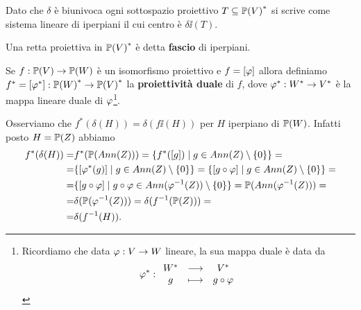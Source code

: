 \begin{multicols*}{2}
    \begin{remark}
    Dato che $\delta$ \`e biunivoca ogni sottospazio proiettivo $T\subseteq {\mathbb{P}(V)}^*$ si scrive come sistema lineare di iperpiani il cui centro \`e $\delta\ii(T)$.
    \end{remark}
    \begin{definition}
    Una retta proiettiva in ${\mathbb{P}(V)}^*$ \`e detta \textbf{fascio} di iperpiani.
    \end{definition}

    \begin{definition}
    Se $f:{\mathbb{P}(V)}\to{\mathbb{P}(W)}$ \`e un isomorfismo proiettivo e $f=[\varphi]$ allora definiamo $f^*=[\varphi^*]:{\mathbb{P}(W)}^*\to{\mathbb{P}(V)}^*$ la \textbf{proiettivit\`a duale} di $f$, dove $\varphi^*:W^*\to V^*$ \`e la mappa lineare duale di $\varphi$\footnote{Ricordiamo che data $\varphi:V\to W$ lineare, la sua mappa duale \`e data da
    \[\varphi^\ast:\begin{array}{ccc} {W^\ast} & \longrightarrow & {V^\ast}\\ {g} & \longmapsto & {g\circ \varphi} \end{array}\]}.
    \end{definition}

    \begin{remark}
    Osserviamo che $f^*(\delta(H))=\delta(f\ii(H))$ per $H$ iperpiano di ${\mathbb{P}(W)}$. Infatti posto $H=\mathbb{P}(Z)$ abbiamo
    \begin{align*}
    f^*(\delta(H))=&f^*(\mathbb{P}(Ann(Z)))=\{f^*([g])\mid g\in Ann(Z)\setminus\{0\}\}=\\
    =&\{[\varphi^*(g)]\mid g\in Ann(Z)\setminus\{0\}\}=\{[g\circ \varphi]\mid g\in Ann(Z)\setminus\{0\}\}=\\
    =&\{[g\circ \varphi]\mid g\circ \varphi\in Ann(\varphi^{-1}(Z))\setminus\{0\}\}=\mathbb{P}(Ann(\varphi^{-1}(Z)))=\\
    =&\delta(\mathbb{P}(\varphi^{-1}(Z)))=\delta(f^{-1}(\mathbb{P}(Z)))=\\
    =&\delta(f^{-1}(H)).
    \end{align*}
    \end{remark}


\end{multicols*}

